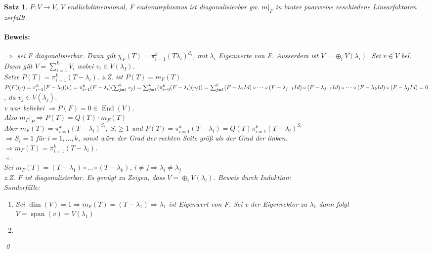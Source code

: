 \documentclass{report}
\newcommand{\lb}{\lambda}
\DeclareMathOperator{\Span}{span}
\DeclareMathOperator{\End}{End}
\theoremstyle{customrem}
\theoremstyle{customdef}
\newtheorem{satz}[definition]{Satz}
\renewenvironment{proof}{\paragraph{Beweis: }}{\qed}
\theoremstyle{customenv}
\begin{document}
\begin{satz}
  \(F : V \to V\), \(V\) endlichdimensional, F endomorphismus ist
  diagonalisierbar gw. \(m|_F\) in lauter paarweise veschiedene Linearfaktoren
  zerf\"allt.
  \begin{proof}\hfill\break
    \(\Rightarrow\) sei F diagonalisierbar. Dann gilt
    \(\chi_F(T) = \pi_{i=1}^k (T\lb_i)^{d_i}\), mit \(\lb_i\) Eigenwerte von F.
    Ausserdem ist \(V = \oplus_i V(\lb_i)\). Sei \(v \in V\) bel. Dann gilt 
    \(V = \sum_{i=1}^k V_i\) wobei \(v_i \in V(\lb_I)\).\\
    Setze \(P(T) = \pi_{i=1}^k (T -\lb_i)\). z.Z. ist \(P(T) = m_F(T)\).
    \(\\
    P(F)(v) = \pi_{i=1}^k(F-\lb_i)(v)\\
    = \pi_{i=1}^k(F-\lb_i)(\sum_{j=1}^k v_j)\\
    = \sum_{j=1}^k (\pi_{i=0}^k(F-\lb_i)(v_j))\\
    = \sum_{j=1}^k (F-\lb_1 Id) \circ \dots \circ (F-\lb_{j-1} Id) \circ (F-\lb_{j+1} Id) \circ \dots \circ (F -\lb_k Id) \circ (F -\lb_j Id)\\
    = 0
    \), da \(v_j \in V(\lb_j)\).\\
    v war beliebei \(\Rightarrow P(F) = 0 \in \End(V)\).\\
    Also \(m_F |_P \Rightarrow P(T) = Q(T) \cdot m_F(T)\)\\
    Aber \(m_F(T) = \pi_{i=1}^k(T-\lb_i)^{S_i}\), \(S_i \ge 1\) und 
    \(P(T) = \pi_{i=1}^k (T-\lb_i) = Q(T) \pi_{i=1}^k(T-\lb_i)^{S_i}\)\\
    \(\Rightarrow S_i=1\) f\"ur \(i=1, \dots, k\), sonst w\"are der Grad der
    rechten Seite gr\"o\ss{} als der Grad der linken.\\
    \(\Rightarrow m_F(T) = \pi_{i=1}^k(T-\lb_i)\).\\
    \(\Leftarrow\)\\
    Sei \(m_F(T) = (T-\lb_1) \circ \dots \circ (T-\lb_k)\), \(i \neq j \Rightarrow \lb_i \neq \lb_j\)\\
    z.Z. \(F\) ist diagonalisierbar. Es gen\"ugt zu Zeigen, dass
    \(V = \oplus_i V(\lb_i)\). Beweis durch Induktion:\\
    Sonderf\"alle:
    \begin{enumerate}
      \item{
        Sei \(\dim(V) = 1 \Rightarrow m_F(T) = (T-\lb_1) \Rightarrow \lb_1\)
        ist Eigenwert von F. Sei v der Eigenvektor zu \(\lb_1\) dann folgt
        \(V = \Span(v) = V(\lb_1)\)
      }
      \item {
}
\end{enumerate}
\end{proof}
\end{satz}
\end{document}
